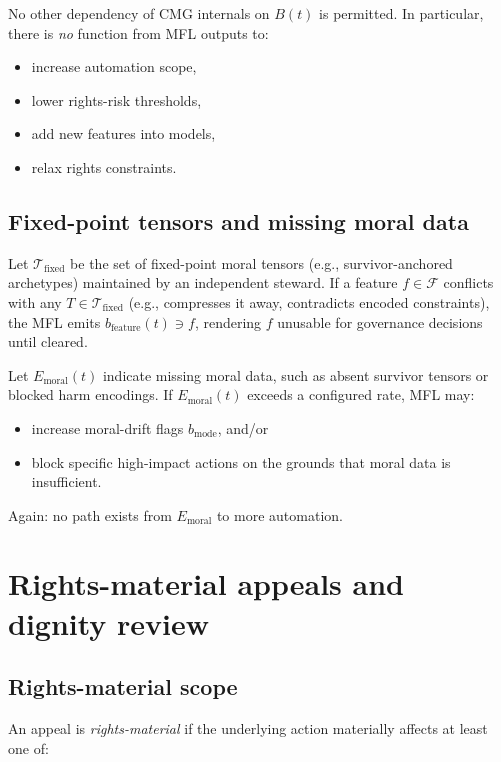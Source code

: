\documentclass[11pt]{article}
\begin{document}
No other dependency of CMG internals on \(B(t)\) is permitted.
In particular, there is \emph{no} function from MFL outputs to:

\begin{itemize}[leftmargin=*]
  \item increase automation scope,
  \item lower rights-risk thresholds,
  \item add new features into models,
  \item relax rights constraints.
\end{itemize}

\subsection{Fixed-point tensors and missing moral data}

Let \(\mathcal{T}_{\text{fixed}}\) be the set of fixed-point moral tensors (e.g., survivor-anchored archetypes) maintained by an independent steward.
If a feature \(f\in\mathcal{F}\) conflicts with any \(T \in \mathcal{T}_{\text{fixed}}\) (e.g., compresses it away, contradicts encoded constraints), the MFL emits \(b_{\text{feature}}(t) \ni f\), rendering \(f\) unusable for governance decisions until cleared.

Let \(E_{\text{moral}}(t)\) indicate missing moral data, such as absent survivor tensors or blocked harm encodings.
If \(E_{\text{moral}}(t)\) exceeds a configured rate, MFL may:

\begin{itemize}[leftmargin=*]
  \item increase moral-drift flags \(b_{\text{mode}}\), and/or
  \item block specific high-impact actions on the grounds that moral data is insufficient.
\end{itemize}

Again: no path exists from \(E_{\text{moral}}\) to more automation.

\section{Rights-material appeals and dignity review}

\subsection{Rights-material scope}

An appeal is \emph{rights-material} if the underlying action materially affects at least one of:
\end{document}
